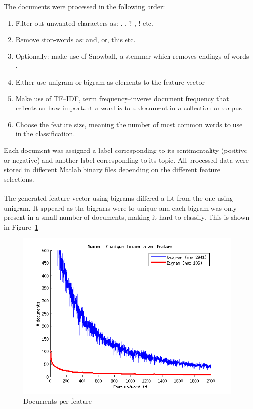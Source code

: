 The documents were processed in the following order:
\begin{enumerate}
\item Filter out unwanted characters as: . , ? , ! etc.
\item Remove stop-words as: and, or, this etc.
\item Optionally: make use of Snowball, a stemmer which removes endings of
words \citep{snowball_url}.
\item Either use unigram or bigram as elements to the feature vector
\item Make use of TF–IDF, term frequency–inverse document frequency that
reflects on how important a word is to a document in a collection or corpus
\item Choose the feature size, meaning the number of most common words to use
 in the classification.
\end{enumerate}
Each document was assigned a label corresponding to its sentimentality
(positive or negative) and another label corresponding to its topic.
All processed data were stored in different Matlab binary files depending on the
different feature selections.
\\\\
The generated feature vector using bigrams differed a lot from the one using
unigram. It appeard as the bigrams were to unique and each bigram was only
present in a small number of documents, making it hard to classify. This is
shown in Figure~\ref{fig:docperfeature}
\begin{figure}[h!]
\centering
        \includegraphics[scale = 0.6]{../Plottar/documents_per_feature.png}
\caption{Documents per feature}
\label{fig:docperfeature}
\end{figure}


